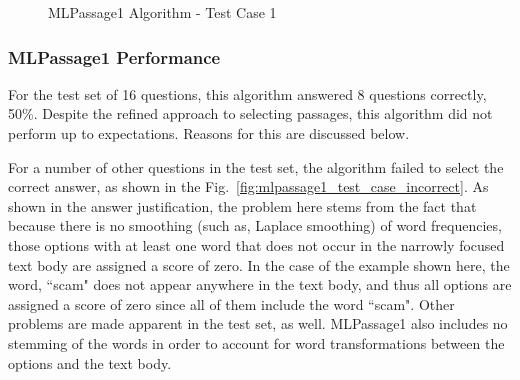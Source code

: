\begin{figure}
\centering
\vspace{1.0in}
\caption{MLPassage1 Algorithm - Test Case 1}
\label{fig:mlpassage1_test_case_correct}
\end{figure}

\subsubsection{MLPassage1 Performance}

For the test set of 16 questions, this algorithm answered 8 questions correctly, 50\%.  Despite the refined approach to selecting passages, this algorithm did not perform up to expectations.  Reasons for this are discussed below.


For a number of other questions in the test set, the algorithm failed to select the correct answer, as shown in the Fig.~\ref{fig:mlpassage1_test_case_incorrect}.  As shown in the answer justification, the problem here stems from the fact that because there is no smoothing (such as, Laplace smoothing) of word frequencies, those options with at least one word that does not occur in the narrowly focused text body are assigned a score of zero.  In the case of the example shown here, the word, ``scam" does not appear anywhere in the text body, and thus all options are assigned a score of zero since all of them include the word ``scam".  Other problems are made apparent in the test set, as well.  MLPassage1 also includes no stemming of the words in order to account for word transformations between the options and the text body.  

